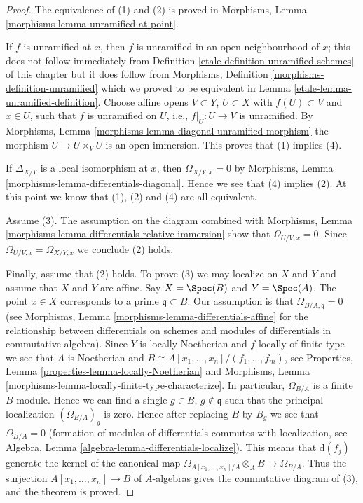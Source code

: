 \begin{proof}

The equivalence of (1) and (2) is proved in
Morphisms, Lemma \ref{morphisms-lemma-unramified-at-point}.

\medskip\noindent
If $f$ is unramified at $x$, then $f$ is unramified in an open
neighbourhood of $x$; this does not follow immediately
from Definition \ref{etale-definition-unramified-schemes} of this chapter
but it does follow from
Morphisms, Definition \ref{morphisms-definition-unramified} which we
proved to be equivalent in
Lemma \ref{etale-lemma-unramified-definition}.
Choose affine opens $V \subset Y$, $U \subset X$
with $f(U) \subset V$ and $x \in U$, such that $f$ is
unramified on $U$, i.e., $f|_U : U \to V$ is unramified.
By Morphisms, Lemma \ref{morphisms-lemma-diagonal-unramified-morphism}
the morphism $U \to U \times_V U$
is an open immersion. This proves that (1) implies (4).

\medskip\noindent
If $\Delta_{X/Y}$ is a local isomorphism at $x$, then
$\Omega_{X/Y, x} = 0$ by
Morphisms, Lemma \ref{morphisms-lemma-differentials-diagonal}.
Hence we see that (4) implies (2).
At this point we know that (1), (2) and (4) are all equivalent.

\medskip\noindent
Assume (3). The assumption on the diagram combined with
Morphisms, Lemma \ref{morphisms-lemma-differentials-relative-immersion}
show that $\Omega_{U/V, x} = 0$. Since $\Omega_{U/V, x} = \Omega_{X/Y, x}$
we conclude (2) holds.

\medskip\noindent
Finally, assume that (2) holds. To prove (3) we may localize on
$X$ and $Y$ and assume that $X$ and $Y$ are affine.
Say $X = \Spec(B)$ and $Y = \Spec(A)$.
The point $x \in X$ corresponds to a prime $\mathfrak q \subset B$.
Our assumption is that $\Omega_{B/A, \mathfrak q} = 0$
(see Morphisms, Lemma \ref{morphisms-lemma-differentials-affine} for the
relationship between differentials on schemes and modules
of differentials in commutative algebra).
Since $Y$ is locally Noetherian and $f$ locally of finite type
we see that $A$ is Noetherian and
$B \cong A[x_1, \ldots, x_n]/(f_1, \ldots, f_m)$, see
Properties, Lemma \ref{properties-lemma-locally-Noetherian} and
Morphisms, Lemma \ref{morphisms-lemma-locally-finite-type-characterize}.
In particular, $\Omega_{B/A}$ is a finite $B$-module. Hence we
can find a single $g \in B$, $g \not \in \mathfrak q$ such that
the principal localization $(\Omega_{B/A})_g$ is zero. Hence after
replacing $B$ by $B_g$ we see that $\Omega_{B/A} = 0$ (formation
of modules of differentials commutes with localization, see
Algebra, Lemma \ref{algebra-lemma-differentials-localize}). This means that
$\text{d}(f_j)$ generate the kernel of the canonical map
$\Omega_{A[x_1, \ldots, x_n]/A} \otimes_A B \to \Omega_{B/A}$.
Thus the surjection $A[x_1, \ldots, x_n] \to B$ of $A$-algebras gives the
commutative diagram of (3), and the theorem is proved.
\end{proof}

